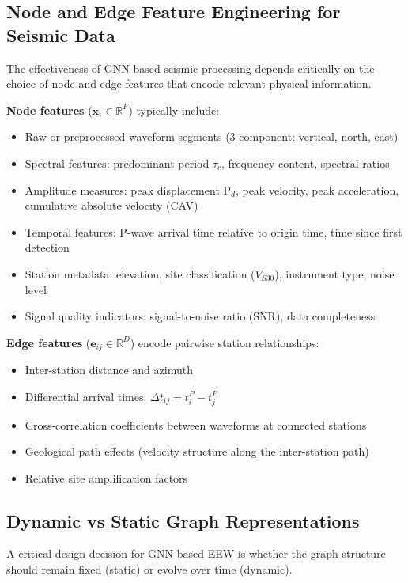 \documentclass[review,authoryear]{elsarticle}
\begin{document}
\subsection{Node and Edge Feature Engineering for Seismic Data}

The effectiveness of GNN-based seismic processing depends critically on the choice of node and edge features that encode relevant physical information.

\textbf{Node features} ($\mathbf{x}_i \in \mathbb{R}^F$) typically include:
\begin{itemize}
  \item Raw or preprocessed waveform segments (3-component: vertical, north, east)
  \item Spectral features: predominant period $\tau_c$, frequency content, spectral ratios
  \item Amplitude measures: peak displacement P$_d$, peak velocity, peak acceleration, cumulative absolute velocity (CAV)
  \item Temporal features: P-wave arrival time relative to origin time, time since first detection
  \item Station metadata: elevation, site classification ($V_{S30}$), instrument type, noise level
  \item Signal quality indicators: signal-to-noise ratio (SNR), data completeness
\end{itemize}

\textbf{Edge features} ($\mathbf{e}_{ij} \in \mathbb{R}^D$) encode pairwise station relationships:
\begin{itemize}
  \item Inter-station distance and azimuth
  \item Differential arrival times: $\Delta t_{ij} = t_i^P - t_j^P$
  \item Cross-correlation coefficients between waveforms at connected stations
  \item Geological path effects (velocity structure along the inter-station path)
  \item Relative site amplification factors
\end{itemize}

\subsection{Dynamic vs Static Graph Representations}

A critical design decision for GNN-based EEW is whether the graph structure should remain fixed (static) or evolve over time (dynamic).
\end{document}
